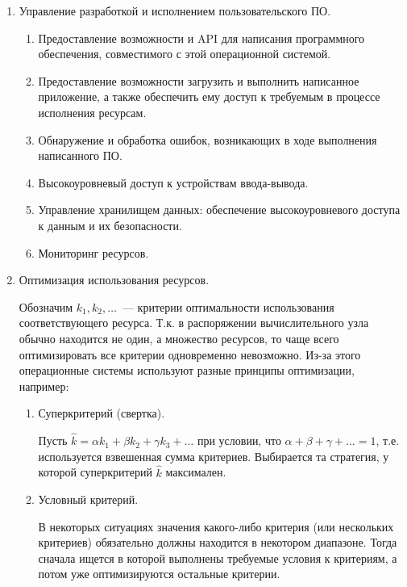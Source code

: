 \begin{enumerate}
\item
  Управление разработкой и исполнением пользовательского ПО.

  \begin{enumerate}
  \item
    Предоставление возможности и API для написания программного обеспечения,
    совместимого с этой операционной системой.
  
  \item
    Предоставление возможности загрузить и выполнить написанное приложение, а
    также обеспечить ему доступ к требуемым в процессе исполнения ресурсам.
  
  \item
    Обнаружение и обработка ошибок, возникающих в ходе выполнения написанного
    ПО.

  \item
    Высокоуровневый доступ к устройствам ввода-вывода.
  
  \item
    Управление хранилищем данных: обеспечение высокоуровневого доступа к данным
    и их безопасности.

  \item
    Мониторинг ресурсов.
  \end{enumerate}

\item
  Оптимизация использования ресурсов.
  
  Обозначим \(k_1, k_2, \dotsc\)~--- критерии оптимальности использования
  соответствующего ресурса. Т.к. в распоряжении вычислительного узла обычно
  находится не один, а множество ресурсов, то чаще всего оптимизировать все
  критерии одновременно невозможно. Из-за этого операционные системы используют
  разные принципы оптимизации, например:

  \begin{enumerate}
  \item
    Суперкритерий (свертка).

    Пусть \(\widehat{k} = \alpha k_1 + \beta k_2 + \gamma k_3 + \dotsc\) при
    условии, что \(\alpha + \beta + \gamma + \dotsc = 1\), т.е. используется
    взвешенная сумма критериев. Выбирается та стратегия, у которой суперкритерий
    \(\widehat{k}\) максимален.
  
  \item
    Условный критерий.

    В некоторых ситуациях значения какого-либо критерия (или нескольких
    критериев) обязательно должны находится в некотором диапазоне. Тогда сначала
    ищется  в которой выполнены требуемые условия к критериям, а
    потом уже оптимизируются остальные критерии.
  \end{enumerate}
  

\end{enumerate}

